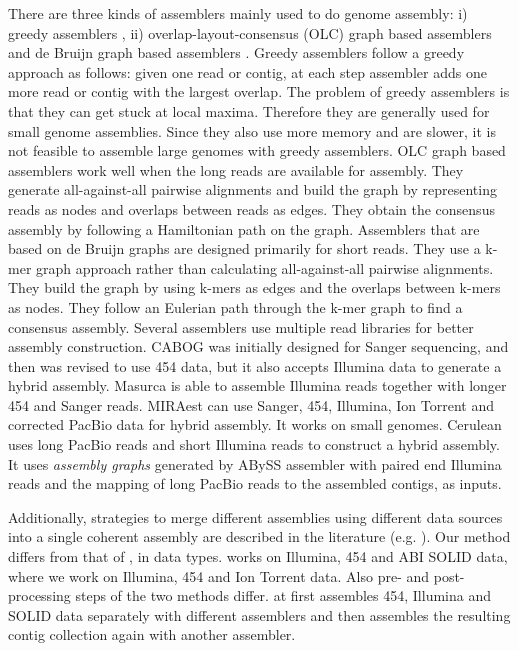 \documentclass{llncs}
\begin{document}
There are three kinds of assemblers mainly used to do genome assembly: i) greedy assemblers \cite{ssake:2007,sharcgs:2007,vcake:2007}, ii) overlap-layout-consensus (OLC) graph based assemblers \cite{celera:2000, sga:2012, hapsemblerDonmez:2011} and de Bruijn graph based assemblers \cite{eulerPevzner:2008, abyssSimpson:2009, velvetZerbino:2008, spadesBankevich:2012, allpaths:2008}. Greedy assemblers follow a greedy approach  as follows: given one read or contig,  at each step assembler adds one more read or contig with the largest overlap. The problem of greedy assemblers is that they can get stuck at local maxima. Therefore they are generally used for small genome assemblies. Since they also use more memory and are slower, it is not feasible to assemble large genomes with greedy assemblers.
OLC graph based assemblers work well when the long reads are available for assembly. They generate all-against-all pairwise alignments and build the graph by representing reads as nodes and overlaps between reads as edges. 
They obtain the consensus assembly by following a Hamiltonian path on the graph. 
Assemblers that are based on de Bruijn graphs are designed primarily for short reads. 
They use a k-mer graph approach rather than calculating all-against-all pairwise alignments. They build the graph by using k-mers as edges and the overlaps between k-mers as nodes. They follow an Eulerian path through the k-mer graph to find a consensus assembly.
Several assemblers use multiple read libraries \cite{cabogMiller:2008, masurcaZimin:2013, miraest, cerulian:2013} for better assembly construction. CABOG \cite{cabogMiller:2008} was initially designed for Sanger sequencing, and then was revised to use 454 data, but it also accepts Illumina data to 
generate a hybrid assembly. Masurca \cite{masurcaZimin:2013} is able to assemble Illumina reads   together with longer 454 and Sanger reads. MIRAest \cite{miraest} can use Sanger, 454, Illumina, Ion Torrent and corrected PacBio data for hybrid assembly. It works on small genomes. Cerulean \cite{cerulian:2013} uses long PacBio reads and short Illumina reads to construct a hybrid assembly. It uses \textit{assembly graphs} generated by ABySS \cite{abyssSimpson:2009} assembler with paired end Illumina reads and the mapping of long PacBio reads to the assembled contigs, as inputs.

Additionally, strategies to merge different assemblies using different data sources into a single coherent assembly are described in the literature (e.g. \cite{wang:2012}). Our method differs from that of \cite{wang:2012}, in data types. \cite{wang:2012} works on Illumina, 454 and ABI SOLID data, where we work on Illumina, 454 and Ion Torrent data. Also pre- and post-processing steps of the two methods differ. \cite{wang:2012} at first assembles 454, Illumina and SOLID data separately with different assemblers and then assembles the resulting contig collection again with another assembler.
\end{document}

